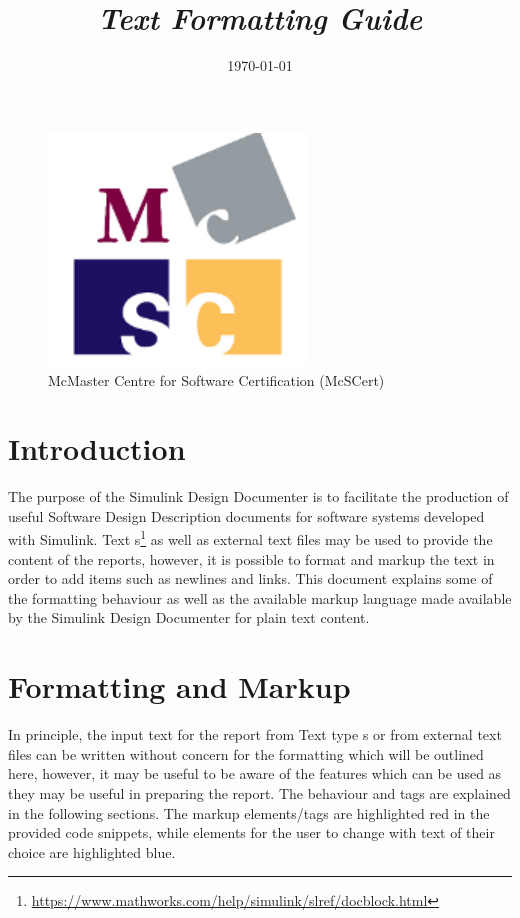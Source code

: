 \documentclass{article}
\title{\ToolName \\[.75em] {\large \textit{Text Formatting Guide}}}
\date{\monthyeardate\today}
\makeatletter
\newcommand{\ToolName}{Simulink Design Documenter\@\xspace}
\newcommand{\sdd}{Software Design Description\@\xspace}
\makeatother
\begin{document}
\maketitle
\vfill

\begin{figure}
	\centering
	\includegraphics[]{../../figs/McSCert_Logo.pdf} \\
	McMaster Centre for Software Certification (McSCert)
\end{figure}

\newpage

\section{Introduction}

The purpose of the \ToolName is to facilitate the production of useful \sdd documents for software systems developed with Simulink. Text s\footnote{\url{https://www.mathworks.com/help/simulink/slref/docblock.html}} as well as external text files may be used to provide the content of the reports, however, it is possible to format and markup the text in order to add items such as newlines and links. This document explains some of the formatting behaviour as well as the available markup language made available by the \ToolName for plain text content.

\section{Formatting and Markup}
In principle, the input text for the report from Text type s or from external text files can be written without concern for the formatting which will be outlined here, however, it may be useful to be aware of the features which can be used as they may be useful in preparing the report. The behaviour and tags are explained in the following sections. The markup elements/tags are highlighted red in the provided code snippets, while elements for the user to change with text of their choice are highlighted blue.
\end{document}
